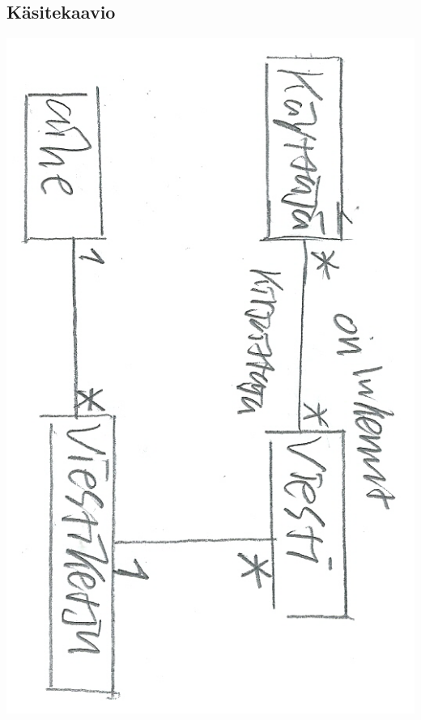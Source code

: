 \documentclass[a4paper, 12pt, finnish]{article}
\begin{document}
\subsection{Käsitekaavio}
\includegraphics[width=\textwidth,height=\textheight,keepaspectratio]{kasitekaavio.png}
\end{document}
